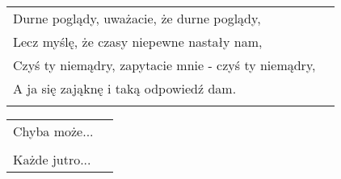 \documentclass[a5paper]{article}
\begin{document}
\noindent
\begin{tabular}{@{}p{8.00cm}p{3cm}@{}}
Durne poglądy, uważacie, że durne poglądy, \\
Lecz myślę, że czasy niepewne nastały nam, \\
Czyś ty niemądry, zapytacie mnie - czyś ty niemądry, \\
A ja się zająknę i taką odpowiedź dam. \\ \\
\end{tabular}

\noindent
\begin{tabular}{@{}p{8.00cm}p{3cm}@{}}
Chyba może... \\ \\
Każde jutro...
\end{tabular}
\end{document}
